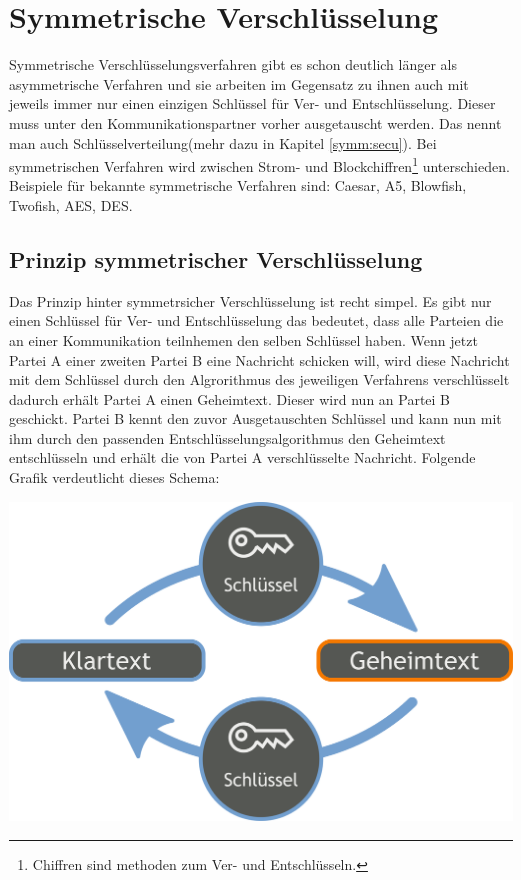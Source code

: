 \documentclass[a4paper,12pt,titlepage]{article}
\begin{document}
\section{Symmetrische Verschlüsselung}\label{symm}
Symmetrische Verschlüsselungsverfahren gibt es schon deutlich länger als asymmetrische Verfahren und sie arbeiten im Gegensatz zu ihnen auch mit jeweils immer nur einen einzigen Schlüssel für Ver- und Entschlüsselung. Dieser muss unter den Kommunikationspartner vorher ausgetauscht werden. Das nennt man auch Schlüsselverteilung(mehr dazu in Kapitel \ref{symm:secu}). \newline
Bei symmetrischen Verfahren wird zwischen Strom- und Blockchiffren\footnote{Chiffren sind methoden zum Ver- und Entschlüsseln.} unterschieden. Beispiele für bekannte symmetrische Verfahren sind: Caesar, A5, Blowfish, Twofish, AES, DES. %

\subsection{Prinzip symmetrischer Verschlüsselung}
Das Prinzip hinter symmetrsicher Verschlüsselung ist recht simpel. Es gibt nur einen Schlüssel für Ver- und Entschlüsselung das bedeutet, dass alle Parteien die an einer Kommunikation teilnhemen den selben Schlüssel haben. Wenn jetzt Partei A einer zweiten Partei B eine Nachricht schicken will, wird diese Nachricht mit dem Schlüssel durch den Algrorithmus des jeweiligen Verfahrens verschlüsselt dadurch erhält Partei A einen Geheimtext. Dieser wird nun an Partei B geschickt. Partei B kennt den zuvor Ausgetauschten Schlüssel und kann nun mit ihm durch den passenden Entschlüsselungsalgorithmus den Geheimtext entschlüsseln und erhält die von Partei A verschlüsselte Nachricht.\newline
Folgende Grafik verdeutlicht dieses Schema:

\begin{center}
\includegraphics[scale=0.2]{symm_shema.png} %
\end{center}
\end{document}
